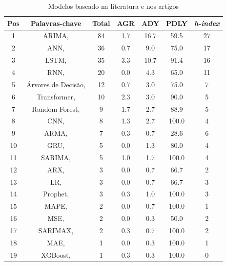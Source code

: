 \begin{table}[H]
	\centering
	\caption{Modelos baseado na literatura e nos artigos}\label{tb:mode}
	\begin{tabular}{ccccccc}
		\toprule
		Pos & Palavras-chave & Total & AGR & ADY & PDLY & \textit{h-index} \\
		\midrule
		1 & ARIMA, \citeonline{2-s2.0-85069459067} & 84 & 1.7 & 16.7 & 59.5 & 27 \\
		2 & ANN, \citeonline{2-s2.0-85054695177} & 36 & 0.7 & 9.0 & 75.0 & 17 \\
		3 & LSTM, \citeonline{WOS:000529902300014} & 35 & 3.3 & 10.7 & 91.4 & 16 \\
		4 & RNN, \citeonline{2-s2.0-85067419084} & 20 & 0.0 & 4.3 & 65.0 & 11 \\
		5 & Árvores de Decisão, \citeonline{2-s2.0-85054695177} & 12 & 0.7 & 3.0 & 75.0 & 7 \\
		6 & Transformer, \citeonline{2-s2.0-85045193200} & 10 & 2.3 & 3.0 & 90.0 & 5 \\
		7 & Random Forest, \citeonline{2-s2.0-85135210428} & 9 & 1.7 & 2.7 & 88.9 & 5 \\
		8 & CNN, \citeonline{WOS:000841076700002} & 8 & 1.3 & 2.7 & 100.0 & 4 \\
		9 & ARMA, \citeonline{2-s2.0-85038637324} & 7 & 0.3 & 0.7 & 28.6 & 6 \\
		10 & GRU, \citeonline{2-s2.0-85135210428} & 5 & 0.0 & 1.3 & 80.0 & 4 \\
		11 & SARIMA, \citeonline{2-s2.0-85128561644} & 5 & 1.0 & 1.7 & 100.0 & 4 \\
		12 & ARX, \citeonline{2-s2.0-85051469381} & 3 & 0.0 & 0.7 & 66.7 & 2 \\
		13 & LR, \citeonline{2-s2.0-85125426780} & 3 & 0.0 & 0.7 & 66.7 & 3 \\
		14 & Prophet, \citeonline{2-s2.0-85092514286} & 3 & 0.3 & 1.0 & 100.0 & 3 \\
		15 & MAPE, \citeonline{2-s2.0-85097173237} & 2 & 0.0 & 0.7 & 100.0 & 1 \\
		16 & MSE, \citeonline{2-s2.0-85096470870} & 2 & 0.0 & 0.3 & 50.0 & 2 \\
		17 & SARIMAX,\citeonline{2-s2.0-85099424908} & 2 & 0.3 & 0.7 & 100.0 & 2 \\
		18 & MAE, \citeonline{2-s2.0-85082955699} & 1 & 0.0 & 0.3 & 100.0 & 1 \\
		19 & XGBoost, \citeonline{2-s2.0-85130441623} & 1 & 0.3 & 0.3 & 100.0 & 0 \\
		\bottomrule
	\end{tabular}
	
	
\end{table}


